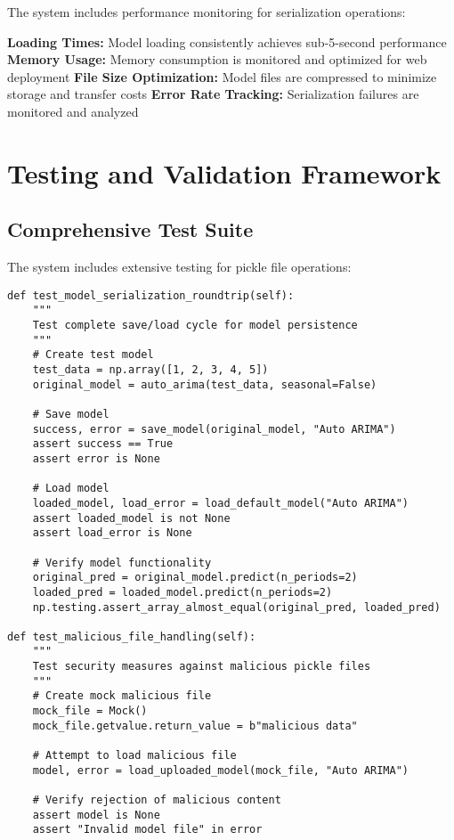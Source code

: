 The system includes performance monitoring for serialization operations:

\textbf{Loading Times:} Model loading consistently achieves sub-5-second performance
\textbf{Memory Usage:} Memory consumption is monitored and optimized for web deployment
\textbf{File Size Optimization:} Model files are compressed to minimize storage and transfer costs
\textbf{Error Rate Tracking:} Serialization failures are monitored and analyzed

\section{Testing and Validation Framework}

\subsection{Comprehensive Test Suite}

The system includes extensive testing for pickle file operations:

\begin{lstlisting}[language=MyPython, caption={Comprehensive Pickle File Testing}]
def test_model_serialization_roundtrip(self):
    """
    Test complete save/load cycle for model persistence
    """
    # Create test model
    test_data = np.array([1, 2, 3, 4, 5])
    original_model = auto_arima(test_data, seasonal=False)
    
    # Save model
    success, error = save_model(original_model, "Auto ARIMA")
    assert success == True
    assert error is None
    
    # Load model
    loaded_model, load_error = load_default_model("Auto ARIMA")
    assert loaded_model is not None
    assert load_error is None
    
    # Verify model functionality
    original_pred = original_model.predict(n_periods=2)
    loaded_pred = loaded_model.predict(n_periods=2)
    np.testing.assert_array_almost_equal(original_pred, loaded_pred)

def test_malicious_file_handling(self):
    """
    Test security measures against malicious pickle files
    """
    # Create mock malicious file
    mock_file = Mock()
    mock_file.getvalue.return_value = b"malicious data"
    
    # Attempt to load malicious file
    model, error = load_uploaded_model(mock_file, "Auto ARIMA")
    
    # Verify rejection of malicious content
    assert model is None
    assert "Invalid model file" in error
\end{lstlisting}


